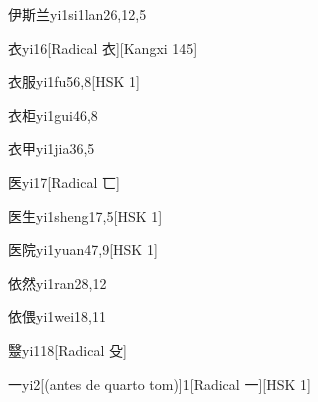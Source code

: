 \begin{entry}{伊斯兰}{yi1si1lan2}{6,12,5}
\end{entry}

\begin{entry}{衣}{yi1}{6}[Radical 衣][Kangxi 145]
\end{entry}

\begin{entry}{衣服}{yi1fu5}{6,8}[HSK 1]
\end{entry}

\begin{entry}{衣柜}{yi1gui4}{6,8}
\end{entry}

\begin{entry}{衣甲}{yi1jia3}{6,5}
\end{entry}

\begin{entry}{医}{yi1}{7}[Radical 匸]
\end{entry}

\begin{entry}{医生}{yi1sheng1}{7,5}[HSK 1]
\end{entry}

\begin{entry}{医院}{yi1yuan4}{7,9}[HSK 1]
\end{entry}

\begin{entry}{依然}{yi1ran2}{8,12}
\end{entry}

\begin{entry}{依偎}{yi1wei1}{8,11}
\end{entry}

\begin{entry}{毉}{yi1}{18}[Radical 殳]
\end{entry}

\begin{entry}{一}{yi2}[(antes de quarto tom)]{1}[Radical 一][HSK 1]
\end{entry}

